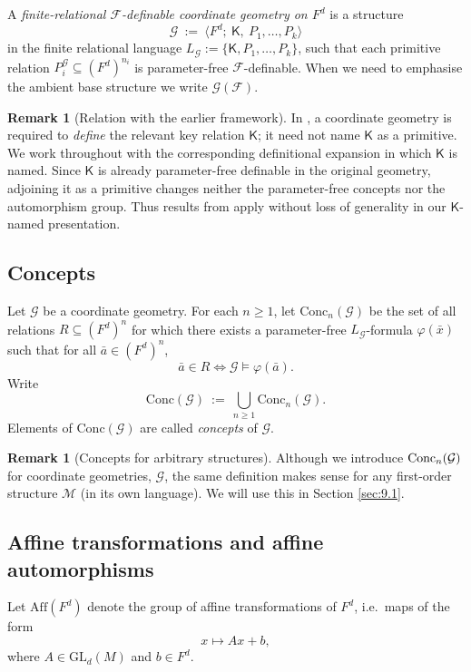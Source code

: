 \documentclass[11pt,a4paper]{article}
\newcommand{\G}{\mathcal{G}}
\newcommand{\F}{\mathcal{F}}
\newcommand{\M}{\mathcal{M}}
\theoremstyle{definition}
\newtheorem{remark}[theorem]{Remark}
\begin{document}
A \emph{finite-relational $\F$-definable coordinate geometry
on $F^d$} is a structure 
\[
\G\ :=\ \langle F^d;\ \mathsf K,\ P_1,\dots,P_k\rangle
\] in the finite relational language $L_{\G}:=\{\mathsf K,P_1,\dots,P_k\}$, such that each primitive relation $P_i^{\G}\subseteq (F^d)^{n_i}$ is
parameter-free $\F$-definable.
When we need to emphasise the ambient base structure we write
$\G(\F)$.


\begin{remark}[Relation with the earlier framework]
\label{rem:2.4} 
In
\cite{MSS26}, a coordinate geometry is required to \emph{define} the
relevant key relation $\mathsf K$; it need not name $\mathsf K$ as a
primitive. We work throughout with the corresponding definitional
expansion in which $\mathsf K$ is named. Since $\mathsf K$ is
already parameter-free definable in the original geometry, adjoining it
as a primitive changes neither the parameter-free concepts nor the
automorphism group. Thus results from \cite{MSS26} apply without loss of
generality in our $\mathsf K$-named presentation.
\end{remark}


\subsection{Concepts}
\label{sec:2.4}

Let $\G$ be a coordinate geometry. For each $n\ge 1$, let
$\mathrm{Conc}_n(\G)$ be the set of all relations
$R\subseteq (F^d)^n$ for which there exists a parameter-free
$L_{\G}$-formula $\varphi(\bar x)$ such that for all
$\bar a\in (F^d)^n$, \[
\bar a\in R \iff \G\models \varphi(\bar a).
\] Write \[
\mathrm{Conc}(\G)\ :=\ \bigcup_{n\ge 1}\mathrm{Conc}_n(\G).
\] Elements of $\mathrm{Conc}(\G)$ are called \emph{concepts} of
$\G$.

\begin{remark}[Concepts for arbitrary structures]
	\label{rem:2.2}
	Although we
	introduce ${\rm Conc}_n(\G)$ for coordinate geometries, $\G$, the same
	definition makes sense for any first-order structure $\M$ (in its own
	language). We will use this in Section \ref{sec:9.1}.
\end{remark}

\subsection{Affine transformations and affine automorphisms}

Let $\mathrm{Aff}(F^d)$ denote the group of affine transformations of
$F^d$, i.e.~maps of the form \[
 x\mapsto Ax+b,
\] where $A\in \mathrm{GL}_d(M)$ and $b\in F^d$.
\end{document}
